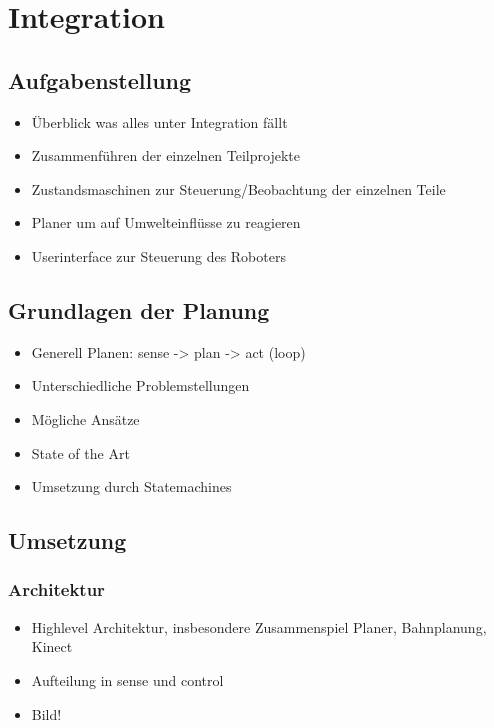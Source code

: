 
\chapter{Integration}
\label{integration_cha}
\authorsection{\editorjulian}

\section{Aufgabenstellung}
\label{aufgabenstellung_integration_sec}

\begin{itemize}
	\item Überblick was alles unter Integration fällt
	\item Zusammenführen der einzelnen Teilprojekte
	\item Zustandsmaschinen zur Steuerung/Beobachtung der einzelnen Teile
	\item Planer um auf Umwelteinflüsse zu reagieren
	\item Userinterface zur Steuerung des Roboters
\end{itemize}

\section{Grundlagen der Planung}
\label{grundlagen_integration_sec}

\begin{itemize}
	\item Generell Planen: sense -> plan -> act (loop)
	\item Unterschiedliche Problemstellungen
	\item Mögliche Ansätze
	\item State of the Art
	\item Umsetzung durch Statemachines
\end{itemize}

\section{Umsetzung}
\label{umsetzung_integration_sec}

\subsection{Architektur}
\label{integration_architektur_sec}

\begin{itemize}
	\item Highlevel Architektur, insbesondere Zusammenspiel Planer, Bahnplanung, Kinect
	\item Aufteilung in sense und control
	\item Bild!
\end{itemize}

